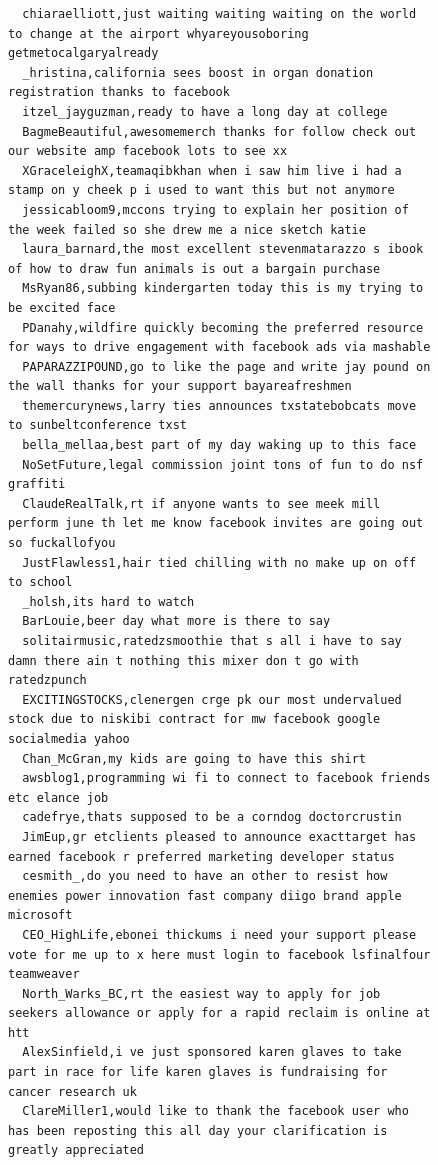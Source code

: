 \begin{figure}[htpb]
\begin{verbatim}
  chiaraelliott,just waiting waiting waiting on the world to change at the airport whyareyousoboring getmetocalgaryalready
  _hristina,california sees boost in organ donation registration thanks to facebook
  itzel_jayguzman,ready to have a long day at college
  BagmeBeautiful,awesomemerch thanks for follow check out our website amp facebook lots to see xx
  XGraceleighX,teamaqibkhan when i saw him live i had a stamp on y cheek p i used to want this but not anymore
  jessicabloom9,mccons trying to explain her position of the week failed so she drew me a nice sketch katie
  laura_barnard,the most excellent stevenmatarazzo s ibook of how to draw fun animals is out a bargain purchase
  MsRyan86,subbing kindergarten today this is my trying to be excited face
  PDanahy,wildfire quickly becoming the preferred resource for ways to drive engagement with facebook ads via mashable
  PAPARAZZIPOUND,go to like the page and write jay pound on the wall thanks for your support bayareafreshmen
  themercurynews,larry ties announces txstatebobcats move to sunbeltconference txst
  bella_mellaa,best part of my day waking up to this face
  NoSetFuture,legal commission joint tons of fun to do nsf graffiti
  ClaudeRealTalk,rt if anyone wants to see meek mill perform june th let me know facebook invites are going out so fuckallofyou
  JustFlawless1,hair tied chilling with no make up on off to school
  _holsh,its hard to watch
  BarLouie,beer day what more is there to say
  solitairmusic,ratedzsmoothie that s all i have to say damn there ain t nothing this mixer don t go with ratedzpunch
  EXCITINGSTOCKS,clenergen crge pk our most undervalued stock due to niskibi contract for mw facebook google socialmedia yahoo
  Chan_McGran,my kids are going to have this shirt
  awsblog1,programming wi fi to connect to facebook friends etc elance job
  cadefrye,thats supposed to be a corndog doctorcrustin
  JimEup,gr etclients pleased to announce exacttarget has earned facebook r preferred marketing developer status
  cesmith_,do you need to have an other to resist how enemies power innovation fast company diigo brand apple microsoft
  CEO_HighLife,ebonei thickums i need your support please vote for me up to x here must login to facebook lsfinalfour teamweaver
  North_Warks_BC,rt the easiest way to apply for job seekers allowance or apply for a rapid reclaim is online at htt
  AlexSinfield,i ve just sponsored karen glaves to take part in race for life karen glaves is fundraising for cancer research uk
  ClareMiller1,would like to thank the facebook user who has been reposting this all day your clarification is greatly appreciated

\end{verbatim}
\end{figure}
